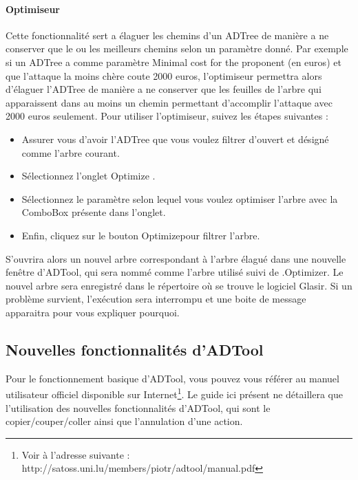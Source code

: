 \paragraph{Optimiseur}Cette fonctionnalité sert a élaguer les chemins d'un ADTree de manière a ne conserver que le ou les meilleurs chemins selon un paramètre donné. Par exemple si un ADTree a comme paramètre \og Minimal cost for the proponent \fg (en euros) et que l'attaque la moins chère coute 2000 euros, l'optimiseur permettra alors d'élaguer l'ADTree de manière a ne conserver que les feuilles de l'arbre qui apparaissent dans au moins un chemin permettant d'accomplir l'attaque avec 2000 euros seulement.
Pour utiliser l'optimiseur, suivez les étapes suivantes :
\begin{itemize}
\item Assurer vous d'avoir l'ADTree que vous voulez filtrer d'ouvert et désigné comme l'arbre courant. 
\item Sélectionnez l'onglet \og Optimize \fg .
\item Sélectionnez le paramètre selon lequel vous voulez optimiser l'arbre avec la ComboBox présente dans l'onglet.
\item Enfin, cliquez sur le bouton \og Optimize\fg pour filtrer l'arbre.
\end{itemize}
S'ouvrira alors un nouvel arbre correspondant à l'arbre élagué dans une nouvelle fenêtre d'ADTool, qui sera nommé comme l'arbre utilisé suivi de \og .Optimizer\fg . Le nouvel arbre sera enregistré dans le répertoire où se trouve le logiciel Glasir.
Si un problème survient, l'exécution sera interrompu et une boite de message apparaitra pour vous expliquer pourquoi.

\subsection{Nouvelles fonctionnalités d'ADTool}
\label{ssec:manuelADTool}

Pour le fonctionnement basique d'ADTool, vous pouvez vous référer au manuel utilisateur officiel disponible sur Internet\footnote{Voir à l'adresse suivante : http://satoss.uni.lu/members/piotr/adtool/manual.pdf}. Le guide ici présent ne détaillera que l'utilisation des nouvelles fonctionnalités d'ADTool, qui sont le copier/couper/coller ainsi que l'annulation d'une action.

